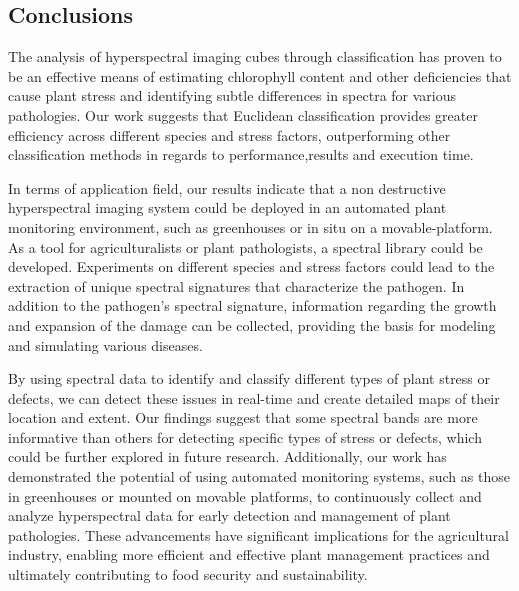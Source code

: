 \documentclass{article}
\begin{document}
                            
                            \newpage
                            
                    \subsection{Conclusions}
                    The analysis of hyperspectral imaging cubes through classification has proven to be an effective means of estimating chlorophyll content and other deficiencies that cause plant stress and identifying subtle differences in spectra for various pathologies. Our work suggests that Euclidean classification provides greater efficiency across different species and stress factors, outperforming other classification methods in regards to performance,results and execution time.\par
                    \vspace*{1\baselineskip}
                    
                    In terms of application field, our results indicate that a non destructive hyperspectral imaging system could be deployed in an automated plant monitoring environment, such as greenhouses or in situ on a movable-platform. As a tool for agriculturalists or plant pathologists, a spectral library could be developed. Experiments on different species and stress factors could lead to the extraction of unique spectral signatures that characterize the pathogen. In addition to the pathogen’s spectral signature, information regarding the growth and expansion of the damage can be collected, providing the basis for modeling and simulating various diseases.\par
                    \vspace*{1\baselineskip}
                    
                    By using spectral data to identify and classify different types of plant stress or defects, we can detect these issues in real-time and create detailed maps of their location and extent. Our findings suggest that some spectral bands are more informative than others for detecting specific types of stress or defects, which could be further explored in future research. Additionally, our work has demonstrated the potential of using automated monitoring systems, such as those in greenhouses or mounted on movable platforms, to continuously collect and analyze hyperspectral data for early detection and management of plant pathologies. These advancements have significant implications for the agricultural industry, enabling more efficient and effective plant management practices and ultimately contributing to food security and sustainability.
                    
\end{document}
